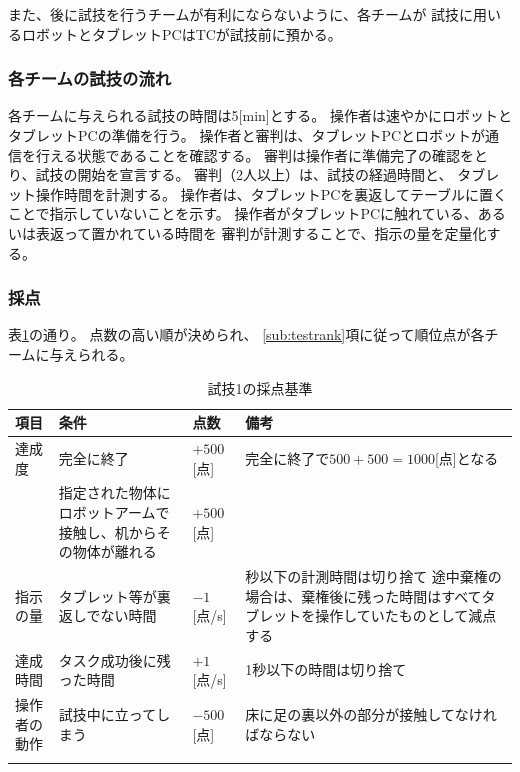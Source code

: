 \documentclass[a4j]{jarticle}
\def\thline{\noalign{\hrule height 1pt}}
\begin{document}
また、後に試技を行うチームが有利にならないように、各チームが
試技に用いるロボットとタブレットPCはTCが試技前に預かる。


\subsubsection{各チームの試技の流れ}

各チームに与えられる試技の時間は5[min]とする。
操作者は速やかにロボットとタブレットPCの準備を行う。
操作者と審判は、タブレットPCとロボットが通信を行える状態であることを確認する。
審判は操作者に準備完了の確認をとり、試技の開始を宣言する。
審判（2人以上）は、試技の経過時間と、
タブレット操作時間を計測する。
操作者は、タブレットPCを裏返してテーブルに置くことで指示していないことを示す。
操作者がタブレットPCに触れている、あるいは表返って置かれている時間を
審判が計測することで、指示の量を定量化する。

\subsubsection{採点}

表\ref{table:test1score}の通り。
点数の高い順が決められ、
\ref{sub:testrank}項に従って順位点が各チームに与えられる。


\begin{table}
\begin{center}
\caption{試技1の採点基準}
\label{table:test1score}
\begin{tabular}{l|p{5cm}|l|p{5cm}}
\thline
項目 & 条件 & 点数 & 備考\\
\hline
達成度 & 完全に終了 & $+500$[点] & 完全に終了で$500+500=1000$[点]となる\\
& 指定された物体にロボットアームで接触し、机からその物体が離れる & $+500$[点] \\
\hline
指示の量 & タブレット等が裏返しでない時間& $-1$[点/s] & 秒以下の計測時間は切り捨て
途中棄権の場合は、棄権後に残った時間はすべてタブレットを操作していたものとして減点する\\
\hline
達成時間 & タスク成功後に残った時間 & $+1$[点/s] & 1秒以下の時間は切り捨て\\
\hline
操作者の動作 & 試技中に立ってしまう & $-500$[点] & 床に足の裏以外の部分が接触してなければならない \\
\thline
\end{tabular}
\end{center}
\end{table}
\end{document}
